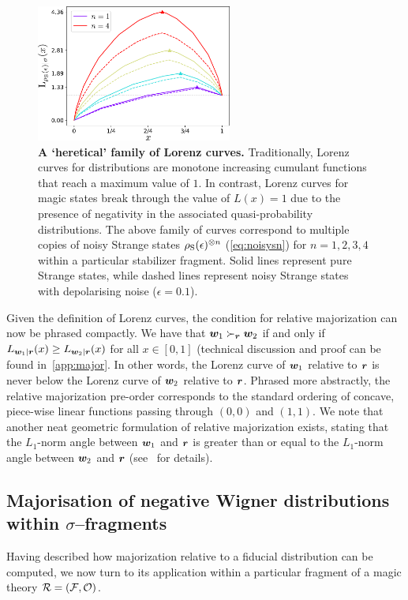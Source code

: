 \documentclass[pra,
aps,
twocolumn,
superscriptaddress,
groupedaddress,
nofootinbib,
reprint
]{revtex4-1}
\begin{document}
\begin{figure}
    \centering
    \includegraphics[height=4.5cm]{figs/lc_strange.pdf}
    \caption{\textbf{A `heretical' family of Lorenz curves.} Traditionally, Lorenz curves for distributions are monotone increasing cumulant functions that reach a maximum value of $1$. In contrast, Lorenz curves for magic states break through the value of $L(x)=1$ due to the presence of negativity in the associated quasi-probability distributions. The above family of curves correspond to multiple copies of noisy Strange states $\rho_{\rm{S}}(\epsilon)^{\otimes n}$ (\cref{eq:noisysn}) for $n=1,2,3,4$ within a particular stabilizer fragment. Solid lines represent pure Strange states, while dashed lines represent noisy Strange states with depolarising noise ($\epsilon = 0.1$).
    }
    \label{fig:lcs}
\end{figure}

Given the definition of Lorenz curves, the condition for relative majorization can now be phrased compactly. We have that $\boldsymbol{w}_1 \succ_{\boldsymbol{r}} \boldsymbol{w}_2$ if and only if $L_{\boldsymbol{w}_1 | \boldsymbol{r}} (x) \ge L_{\boldsymbol{w}_2 | \boldsymbol{r}}(x)$ for all $x \in [0,1]$ (technical discussion and proof can be found in~\cref{app:major}. In other words, the Lorenz curve of $\boldsymbol{w}_1$ relative to $\boldsymbol{r}$ is never below the Lorenz curve of $\boldsymbol{w}_2$ relative to $\boldsymbol{r}$. Phrased more abstractly, the relative majorization pre-order corresponds to the standard ordering of concave, piece-wise linear functions passing through $(0,0)$ and $(1,1)$. We note that another neat geometric formulation of relative majorization exists, stating that the $L_1$-norm angle between $\boldsymbol{w}_1$ and $\boldsymbol{r}$ is greater than or equal to the $L_1$-norm angle between $\boldsymbol{w}_2$ and $\boldsymbol{r}$ (see~\cite{Busch_1998} for details).

\subsection{Majorisation of negative Wigner distributions within $\sigma$--fragments}\label{sec:major_frag}

Having described how majorization relative to a fiducial distribution can be computed, we now turn to its application within a particular fragment of a magic theory $\mathcal{R}= (\mathcal{F}, \mathcal{O})$.
\end{document}
